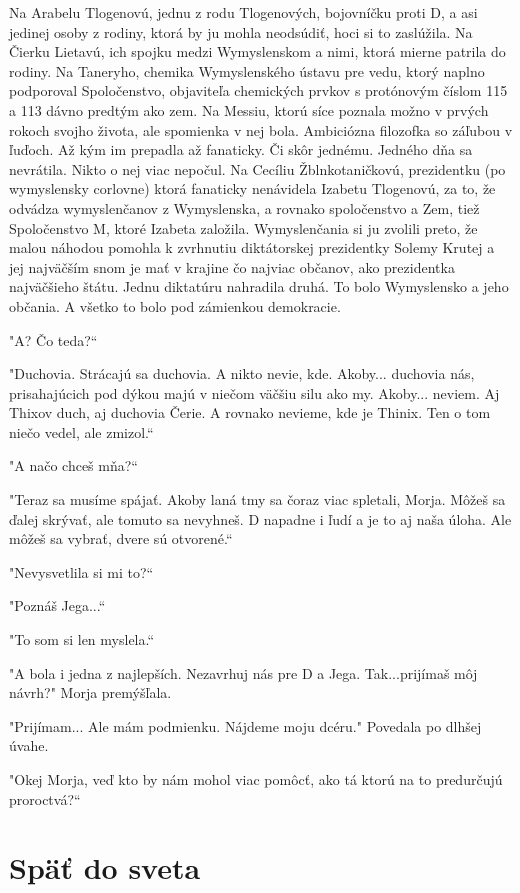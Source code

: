 \documentclass{book}
\begin{document}
Na Arabelu Tlogenovú, jednu z rodu Tlogenových, bojovníčku proti D, a asi jedinej osoby z rodiny, ktorá by ju mohla neodsúdiť, hoci si to zaslúžila. Na Čierku Lietavú, ich spojku medzi Wymyslenskom a nimi, ktorá mierne patrila do rodiny. Na Taneryho, chemika Wymyslenského ústavu pre vedu, ktorý naplno podporoval Spoločenstvo, objaviteľa chemických prvkov s protónovým číslom 115 a 113 dávno predtým ako zem. Na Messiu, ktorú síce poznala možno v prvých rokoch svojho života, ale spomienka v nej bola. Ambiciózna filozofka so záľubou v ľuďoch. Až kým im prepadla až fanaticky. Či skôr jednému. Jedného dňa sa nevrátila. Nikto o nej viac nepočul. Na Cecíliu Žblnkotaničkovú, prezidentku (po wymyslensky corlovne) ktorá fanaticky nenávidela Izabetu Tlogenovú, za to, že odvádza wymyslenčanov z Wymyslenska, a rovnako spoločenstvo a Zem, tiež Spoločenstvo M, ktoré Izabeta založila. Wymyslenčania si ju zvolili preto, že malou náhodou pomohla k zvrhnutiu diktátorskej prezidentky Solemy Krutej a jej najväčším snom je mať v krajine čo najviac občanov, ako prezidentka najväčšieho štátu. Jednu diktatúru nahradila druhá. To bolo Wymyslensko a jeho občania. A všetko to bolo pod zámienkou demokracie.

"$ $A? Čo teda?“

"Duchovia. Strácajú sa duchovia. A nikto nevie, kde. Akoby... duchovia nás, prisahajúcich pod dýkou majú v niečom väčšiu silu ako my. Akoby... neviem. Aj Thixov duch, aj duchovia Čerie. A rovnako nevieme, kde je Thinix. Ten o tom niečo vedel, ale zmizol.“

"$ $A načo chceš mňa?“

"Teraz sa musíme spájať. Akoby laná tmy sa čoraz viac spletali, Morja. Môžeš sa ďalej skrývať, ale tomuto sa nevyhneš. D napadne i ľudí a je to aj naša úloha. Ale môžeš sa vybrať, dvere sú otvorené.“

"Nevysvetlila si mi to?“

"Poznáš Jega...“

"To som si len myslela.“

"$ $A bola i jedna z najlepších. Nezavrhuj nás pre D a Jega. Tak...prijímaš môj návrh?"$ $ Morja premýšľala.

"Prijímam... Ale mám podmienku. Nájdeme moju dcéru."$ $ Povedala po dlhšej úvahe.

"$ $Okej Morja, veď kto by nám mohol viac pomôcť, ako tá ktorú na to predurčujú proroctvá?“

\newpage

\chapter{Späť do sveta}
\end{document}
